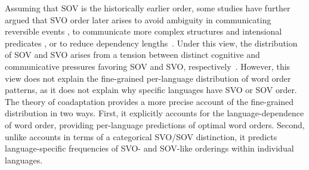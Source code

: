 \documentclass[11pt,a4paper]{article}
\begin{document}
Assuming that SOV is the historically earlier order, some studies have further argued that SVO order later arises to avoid ambiguity in communicating reversible events \citep{gibson-noisy-channel-2013, hall2013cognitive}, to communicate more complex structures \citep{langus2010cognitive, marno2015a, ferrer-i-cancho-placement-2017} and intensional predicates \citep{schouwstra-semantic-2011,napoli2017influence}, or to reduce dependency lengths~\citep{ferrer-i-cancho-placement-2017}.
Under this view, the distribution of SOV and SVO arises from a tension between distinct cognitive and communicative pressures favoring SOV and SVO, respectively~\citep{langus2010cognitive}.
However, this view does not explain the fine-grained per-language distribution of word order patterns, as it does not explain why specific languages have SVO or SOV order.
The theory of coadaptation provides a more precise account of the fine-grained distribution in two ways. First, it explicitly accounts for the language-dependence of word order, providing per-language predictions of optimal word orders.
Second, unlike accounts in terms of a categorical SVO/SOV distinction, it predicts language-specific frequencies of SVO- and SOV-like orderings within individual languages.












\end{document}
